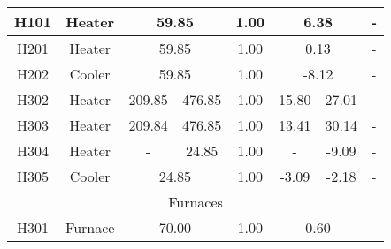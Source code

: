 \begin{table}[h]
{\begin{tabular}{|l|l|l|c|c|c|c|c|c|c|}
\multicolumn{1}{|c|}{H101}                 & \multicolumn{2}{c|}{Heater}                           & \multicolumn{2}{c|}{59.85}            & 1.00                            & \multicolumn{2}{c|}{6.38}           & \multicolumn{2}{c|}{-}                      \\ \hline
\multicolumn{1}{|c|}{H201}                 & \multicolumn{2}{c|}{Heater}                           & \multicolumn{2}{c|}{59.85}            & 1.00                            & \multicolumn{2}{c|}{0.13}           & \multicolumn{2}{c|}{-}                      \\ \hline
\multicolumn{1}{|c|}{H202}                 & \multicolumn{2}{c|}{Cooler}                           & \multicolumn{2}{c|}{59.85}            & 1.00                            & \multicolumn{2}{c|}{-8.12}          & \multicolumn{2}{c|}{-}                      \\ \hline
\multicolumn{1}{|c|}{H302}                 & \multicolumn{2}{c|}{Heater}                           & 209.85            & 476.85            & 1.00                            & 15.80            & 27.01            & \multicolumn{2}{c|}{-}                      \\ \hline
\multicolumn{1}{|c|}{H303}                 & \multicolumn{2}{c|}{Heater}                           & 209.84            & 476.85            & 1.00                            & 13.41            & 30.14            & \multicolumn{2}{c|}{-}                      \\ \hline
\multicolumn{1}{|c|}{H304}                 & \multicolumn{2}{c|}{Heater}                           & -                 & 24.85             & 1.00                            & -                & -9.09            & \multicolumn{2}{c|}{-}                      \\ \hline
\multicolumn{1}{|c|}{H305}                 & \multicolumn{2}{c|}{Cooler}                           & \multicolumn{2}{c|}{24.85}            & 1.00                            & -3.09            & -2.18            & \multicolumn{2}{c|}{-}                      \\ \hline
\multicolumn{10}{|c|}{Furnaces}                                                                                                                                                                                                                                  \\ \hline
\multicolumn{1}{|c|}{H301}                 & \multicolumn{2}{c|}{Furnace}                          & \multicolumn{2}{c|}{70.00}            & 1.00                            & \multicolumn{2}{c|}{0.60}           & \multicolumn{2}{c|}{-}                      \\ \hline
\end{tabular}%
}
\end{table}

